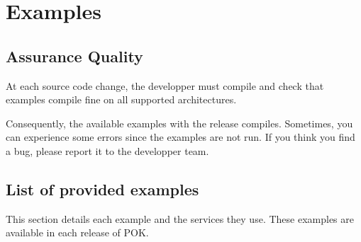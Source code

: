 %
% 
%
%
%
%
%


\chapter{Examples}

\section{Assurance Quality}
At each source code change, the developper must compile and check that examples
compile fine on all supported architectures.

Consequently, the available examples with the release compiles. Sometimes, you
can experience some errors since the examples are not run. If you think you find
a bug, please report it to the developper team.

\section{List of provided examples}
This section details each example and the services they use.
These examples are available in each release of POK.

